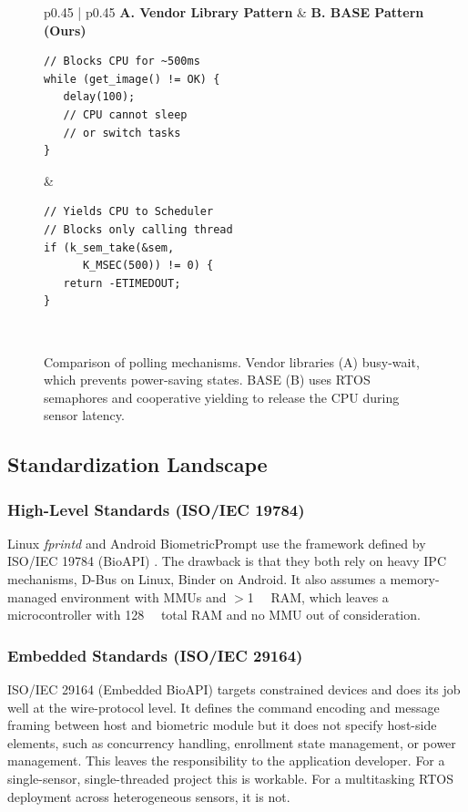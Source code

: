 \begin{figure}
\centering
\begin{scriptsize}
\begin{tabular}{p{} | p{}}
\textbf{A. Vendor Library Pattern} & \textbf{B. BASE Pattern (Ours)} \\
\hline
\begin{verbatim}
// Blocks CPU for ~500ms
while (get_image() != OK) {
   delay(100);
   // CPU cannot sleep
   // or switch tasks
}
\end{verbatim}
&
\begin{verbatim}
// Yields CPU to Scheduler
// Blocks only calling thread
if (k_sem_take(&sem,
      K_MSEC(500)) != 0) {
   return -ETIMEDOUT;
}
\end{verbatim}
\\
\end{tabular}
\end{scriptsize}
\caption{Comparison of polling mechanisms. Vendor libraries (A) busy-wait, which prevents power-saving states. BASE (B) uses RTOS semaphores and cooperative yielding to release the CPU during sensor latency.}
\label{fig:blocking_comparison}
\end{figure}

\subsection{Standardization Landscape}
\subsubsection{High-Level Standards (ISO/IEC 19784)}
 Linux \textit{fprintd} \cite{linux_fprintd} and Android BiometricPrompt \cite{android_bio} use the framework defined by ISO/IEC 19784 (BioAPI) \cite{iso19784}. The drawback is that they both rely on heavy IPC mechanisms, D-Bus on Linux, Binder on Android. It also assumes a memory-managed environment with MMUs and $>$\SI{1}{\mega\byte} RAM, which leaves a microcontroller with \SI{128}{\kilo\byte} total RAM and no MMU out of consideration.

\subsubsection{Embedded Standards (ISO/IEC 29164)}
ISO/IEC 29164 (Embedded BioAPI) \cite{iso29164} targets constrained devices and does its job well at the wire-protocol level. It defines the command encoding and message framing between host and biometric module but it does not specify host-side elements, such as concurrency handling, enrollment state management, or power management. This leaves the responsibility to the application developer. For a single-sensor, single-threaded project this is workable. For a multitasking RTOS deployment across heterogeneous sensors, it is not.

